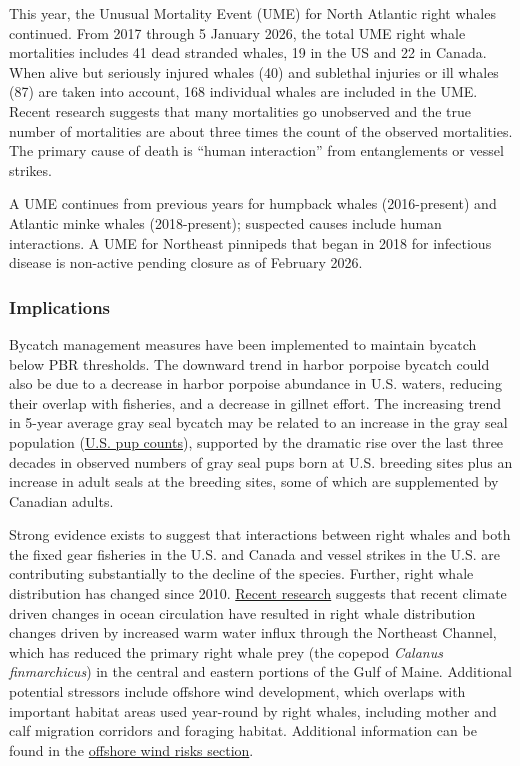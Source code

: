 \documentclass[
  10pt,
]{article}
\begin{document}
This year, the Unusual Mortality Event (UME) for North Atlantic right whales continued. From 2017 through 5 January 2026, the total UME right whale mortalities includes 41 dead stranded whales, 19 in the US and 22 in Canada. When alive but seriously injured whales (40) and sublethal injuries or ill whales (87) are taken into account, 168 individual whales are included in the UME. Recent research suggests that many mortalities go unobserved and the true number of mortalities are about three times the count of the observed mortalities. The primary cause of death is ``human interaction'' from entanglements or vessel strikes.

A UME continues from previous years for humpback whales (2016-present) and Atlantic minke whales (2018-present); suspected causes include human interactions. A UME for Northeast pinnipeds that began in 2018 for infectious disease is non-active pending closure as of February 2026.

\subsubsection{Implications}\label{implications-4}

Bycatch management measures have been implemented to maintain bycatch below PBR thresholds. The downward trend in harbor porpoise bycatch could also be due to a decrease in harbor porpoise abundance in U.S. waters, reducing their overlap with fisheries, and a decrease in gillnet effort. The increasing trend in 5-year average gray seal bycatch may be related to an increase in the gray seal population (\href{https://noaa-edab.github.io/catalog/seal_pups.html}{U.S. pup counts}), supported by the dramatic rise over the last three decades in observed numbers of gray seal pups born at U.S. breeding sites plus an increase in adult seals at the breeding sites, some of which are supplemented by Canadian adults.

Strong evidence exists to suggest that interactions between right whales and both the fixed gear fisheries in the U.S. and Canada and vessel strikes in the U.S. are contributing substantially to the decline of the species. Further, right whale distribution has changed since 2010. \href{https://noaa-edab.github.io/catalog/narw.html}{Recent research} suggests that recent climate driven changes in ocean circulation have resulted in right whale distribution changes driven by increased warm water influx through the Northeast Channel, which has reduced the primary right whale prey (the copepod \emph{Calanus finmarchicus}) in the central and eastern portions of the Gulf of Maine. Additional potential stressors include offshore wind development, which overlaps with important habitat areas used year-round by right whales, including mother and calf migration corridors and foraging habitat. Additional information can be found in the \hyperref[other-ocean-uses-offshore-wind]{offshore wind risks section}.
\end{document}

